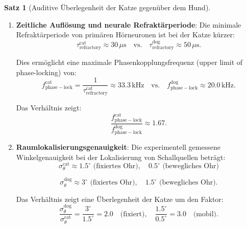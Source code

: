 ﻿\documentclass[12pt, a4paper]{article}
\theoremstyle{definition}
\newtheorem{satz}{Satz}[section]
\theoremstyle{remark}
\begin{document}
\begin{satz}[Auditive Überlegenheit der Katze gegenüber dem Hund]
\begin{enumerate}
d.h. die Basilarmembran der Katze wird etwa $3.16\times$ stärker in Auslenkung verstärkt als die des Hundes.

\item \textbf{Zeitliche Auflösung und neurale Refraktärperiode}: 
Die minimale Refraktärperiode von primären Hörneuronen ist bei der Katze kürzer:
\begin{equation}
\tau_{\mathrm{refractory}}^{\mathrm{cat}} \approx 30\,\mu\mathrm{s} \quad \text{vs.} \quad \tau_{\mathrm{refractory}}^{\mathrm{dog}} \approx 50\,\mu\mathrm{s}.
\label{eq:refractory_period_cat_dog}
\end{equation}

Dies ermöglicht eine maximale Phasenkopplungsfrequenz (upper limit of phase-locking) von:
\begin{equation}
f_{\mathrm{phase-lock}}^{\mathrm{cat}} = \frac{1}{\tau_{\mathrm{refractory}}^{\mathrm{cat}}} \approx 33.3\,\mathrm{kHz} \quad \text{vs.} \quad f_{\mathrm{phase-lock}}^{\mathrm{dog}} \approx 20.0\,\mathrm{kHz}.
\label{eq:phase_lock_frequency}
\end{equation}

Das Verhältnis zeigt:
\begin{equation}
\frac{f_{\mathrm{phase-lock}}^{\mathrm{cat}}}{f_{\mathrm{phase-lock}}^{\mathrm{dog}}} \approx 1.67.
\label{eq:phase_lock_ratio}
\end{equation}

\item \textbf{Raumlokalisierungsgenauigkeit}: 
Die experimentell gemessene Winkelgenauigkeit bei der Lokalisierung von Schallquellen beträgt:
\begin{equation}
\sigma_\theta^{\mathrm{cat}} \approx 1.5^\circ \text{ (fixiertes Ohr)}, \quad 0.5^\circ \text{ (bewegliches Ohr)}
\label{eq:localization_accuracy_cat}
\end{equation}

\begin{equation}
\sigma_\theta^{\mathrm{dog}} \approx 3^\circ \text{ (fixiertes Ohr)}, \quad 1.5^\circ \text{ (bewegliches Ohr)}.
\label{eq:localization_accuracy_dog}
\end{equation}

Das Verhältnis zeigt eine Überlegenheit der Katze um den Faktor:
\begin{equation}
\frac{\sigma_\theta^{\mathrm{dog}}}{\sigma_\theta^{\mathrm{cat}}} = \frac{3^\circ}{1.5^\circ} = 2.0 \quad \text{(fixiert)}, \quad \frac{1.5^\circ}{0.5^\circ} = 3.0 \quad \text{(mobil)}.
\label{eq:localization_advantage_ratio}
\end{equation}

\end{enumerate}
\end{satz}
\end{document}
